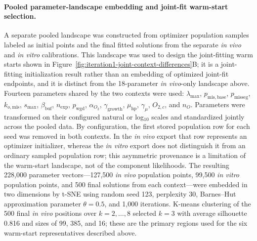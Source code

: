 \documentclass[11pt]{article}
\begin{document}
\paragraph{Pooled parameter-landscape embedding and joint-fit warm-start selection.}
A separate pooled landscape was constructed from optimizer population samples labeled as initial points and the final fitted solutions from the separate \textit{in vivo} and \textit{in vitro} calibrations. This landscape was used to design the joint-fitting warm starts shown in Figure~\ref{fig:iteration1-joint-context-differences}B; it is a joint-fitting initialization result rather than an embedding of optimized joint-fit endpoints, and it is distinct from the 18-parameter \textit{in vivo}-only landscape above. Fourteen parameters shared by the two contexts were used: $\lambda_{\max}$, $p_{\mathrm{mis,base}}$, $p_{\mathrm{misseg}}$, $k_{o,\mathrm{mis}}$, $s_{\max}$, $\beta_{\mathrm{buf}}$, $n_{\mathrm{exp}}$, $p_{\mathrm{wgd}}$, $\alpha_{O_2}$, $\gamma_{\mathrm{growth}}$, $\mu_{\mathrm{hp}}$, $\gamma_\mu$, $O_{2,c}$, and $n_O$. Parameters were transformed on their configured natural or log$_{10}$ scales and standardized jointly across the pooled data. By configuration, the first stored population row for each seed was removed in both contexts. In the \textit{in vivo} export that row represents an optimizer initializer, whereas the \textit{in vitro} export does not distinguish it from an ordinary sampled population row; this asymmetric provenance is a limitation of the warm-start landscape, not of the component likelihoods. The resulting 228,000 parameter vectors---127,500 \textit{in vivo} population points, 99,500 \textit{in vitro} population points, and 500 final solutions from each context---were embedded in two dimensions by t-SNE using random seed 123, perplexity 30, Barnes--Hut approximation parameter $\theta=0.5$, and 1,000 iterations. K-means clustering of the 500 final \textit{in vivo} positions over \(k=2,\ldots,8\) selected \(k=3\) with average silhouette 0.816 and sizes of 99, 385, and 16; these are the primary regions used for the six warm-start representatives described above.
\end{document}
